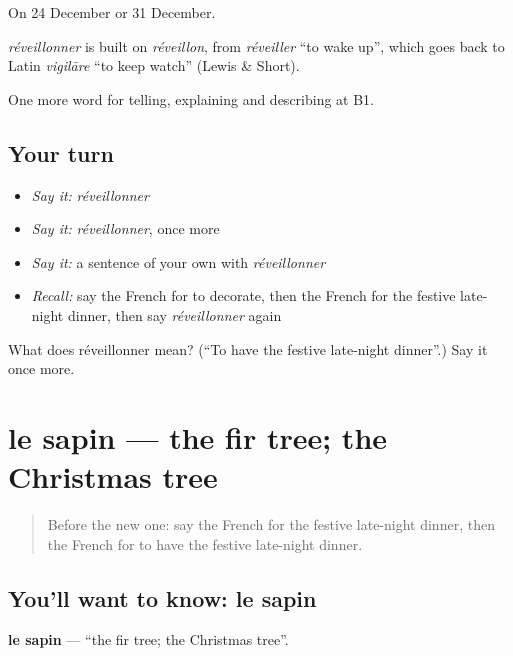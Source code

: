 On 24 December or 31 December.

\begin{cousinweb}
\emph{réveillonner} is built on \emph{réveillon}, from \emph{réveiller} \textquotedblleft{}to wake up\textquotedblright{}, which goes back to Latin \emph{vigilāre} \textquotedblleft{}to keep watch\textquotedblright{} (Lewis \& Short).
\end{cousinweb}

\begin{grammarlens}[title={What you've built}]
One more word for telling, explaining and describing at B1.
\end{grammarlens}

\subsection*{Your turn}
\begin{itemize}
\raggedright
  \item \emph{Say it:} \emph{réveillonner}
  \item \emph{Say it:} \emph{réveillonner}, once more
  \item \emph{Say it:} a sentence of your own with \emph{réveillonner}
  \item \emph{Recall:} say the French for to decorate, then the French for the festive late-night dinner, then say \emph{réveillonner} again
\end{itemize}

\begin{tcolorbox}[breakable,colback=teal!4,colframe=teal!35!black,title={Before you move on}]
What does réveillonner mean? (\textquotedblleft{}To have the festive late-night dinner\textquotedblright{}.) Say it once more.
\end{tcolorbox}
\section[le sapin]{le sapin — the fir tree; the Christmas tree}

\label{lesson:FR-C319-sapin}



\begin{quote}
Before the new one: say the French for the festive late-night dinner, then the French for to have the festive late-night dinner.
\end{quote}

\subsection*{You'll want to know: le sapin}
\textbf{le sapin} — \textquotedblleft{}the fir tree; the Christmas tree\textquotedblright{}.


